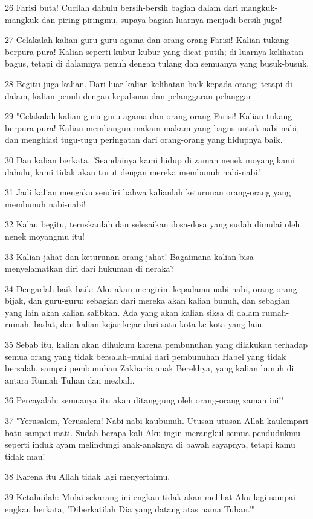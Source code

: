 \par 26 Farisi buta! Cucilah dahulu bersih-bersih bagian dalam dari mangkuk-mangkuk dan piring-piringmu, supaya bagian luarnya menjadi bersih juga!
\par 27 Celakalah kalian guru-guru agama dan orang-orang Farisi! Kalian tukang berpura-pura! Kalian seperti kubur-kubur yang dicat putih; di luarnya kelihatan bagus, tetapi di dalamnya penuh dengan tulang dan semuanya yang busuk-busuk.
\par 28 Begitu juga kalian. Dari luar kalian kelihatan baik kepada orang; tetapi di dalam, kalian penuh dengan kepalsuan dan pelanggaran-pelanggar
\par 29 "Celakalah kalian guru-guru agama dan orang-orang Farisi! Kalian tukang berpura-pura! Kalian membangun makam-makam yang bagus untuk nabi-nabi, dan menghiasi tugu-tugu peringatan dari orang-orang yang hidupnya baik.
\par 30 Dan kalian berkata, 'Seandainya kami hidup di zaman nenek moyang kami dahulu, kami tidak akan turut dengan mereka membunuh nabi-nabi.'
\par 31 Jadi kalian mengaku sendiri bahwa kalianlah keturunan orang-orang yang membunuh nabi-nabi!
\par 32 Kalau begitu, teruskanlah dan selesaikan dosa-dosa yang sudah dimulai oleh nenek moyangmu itu!
\par 33 Kalian jahat dan keturunan orang jahat! Bagaimana kalian bisa menyelamatkan diri dari hukuman di neraka?
\par 34 Dengarlah baik-baik: Aku akan mengirim kepadamu nabi-nabi, orang-orang bijak, dan guru-guru; sebagian dari mereka akan kalian bunuh, dan sebagian yang lain akan kalian salibkan. Ada yang akan kalian siksa di dalam rumah-rumah ibadat, dan kalian kejar-kejar dari satu kota ke kota yang lain.
\par 35 Sebab itu, kalian akan dihukum karena pembunuhan yang dilakukan terhadap semua orang yang tidak bersalah--mulai dari pembunuhan Habel yang tidak bersalah, sampai pembunuhan Zakharia anak Berekhya, yang kalian bunuh di antara Rumah Tuhan dan mezbah.
\par 36 Percayalah: semuanya itu akan ditanggung oleh orang-orang zaman ini!"
\par 37 "Yerusalem, Yerusalem! Nabi-nabi kaubunuh. Utusan-utusan Allah kaulempari batu sampai mati. Sudah berapa kali Aku ingin merangkul semua pendudukmu seperti induk ayam melindungi anak-anaknya di bawah sayapnya, tetapi kamu tidak mau!
\par 38 Karena itu Allah tidak lagi menyertaimu.
\par 39 Ketahuilah: Mulai sekarang ini engkau tidak akan melihat Aku lagi sampai engkau berkata, 'Diberkatilah Dia yang datang atas nama Tuhan.'"

